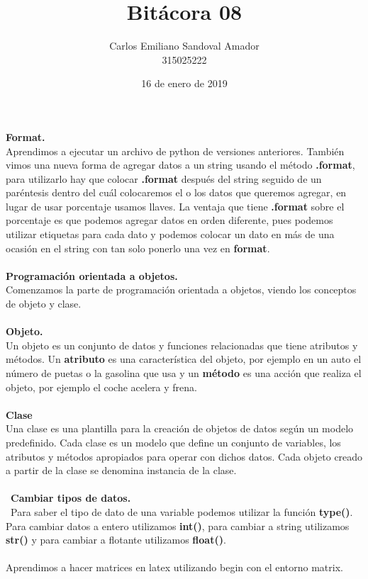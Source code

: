 \documentclass[letterpaper, 12pt, oneside]{article}
\title{Bitácora 08}
\author{Carlos Emiliano Sandoval Amador \\ 315025222}
\date{16 de enero de 2019}
\begin{document}
	\maketitle %
	\textbf{\Large Format.} \\
	Aprendimos a ejecutar un archivo de python de versiones anteriores. También vimos una nueva forma de agregar datos a un string usando el método \textbf{.format}, para utilizarlo hay que colocar \textbf{.format} después del string seguido de un paréntesis dentro del cuál colocaremos el o los datos que queremos agregar, en lugar de usar porcentaje usamos llaves. La ventaja que tiene \textbf{.format} sobre el porcentaje es que podemos agregar datos en orden diferente, pues podemos utilizar etiquetas para cada dato y podemos colocar un dato en más de una ocasión en el string con tan solo ponerlo una vez en \textbf{format}.\\ \\ \textbf{\Large Programación orientada a objetos.} \\
	Comenzamos la parte de programación orientada a objetos, viendo los conceptos de objeto y clase.\\ \\
	 \textbf{Objeto.} \\
	  Un objeto es un conjunto de datos y funciones relacionadas que tiene atributos y métodos. Un \textbf{atributo} es una característica del objeto, por ejemplo en un auto el número de puetas o la gasolina que usa y un \textbf{método} es una acción que realiza el objeto, por ejemplo el coche acelera y frena. \\ \\
	   \textbf{Clase} \\ 
	   Una clase es una plantilla para la creación de objetos de datos según un modelo predefinido. Cada clase es un modelo que define un conjunto de variables, los atributos y métodos apropiados para operar con dichos datos. Cada objeto creado a partir de la clase se denomina instancia de la clase. \\ \\
	    \textbf{\Large Cambiar tipos de datos.} \\ 
	    Para saber el tipo de dato de una variable podemos utilizar la función \textbf{type()}. Para cambiar datos a entero utilizamos \textbf{int()}, para cambiar a string utilizamos \textbf{str()} y para cambiar a flotante utilizamos \textbf{float()}. \\ \\
	Aprendimos a hacer matrices en latex utilizando begin con el entorno matrix.
	
\end{document}
